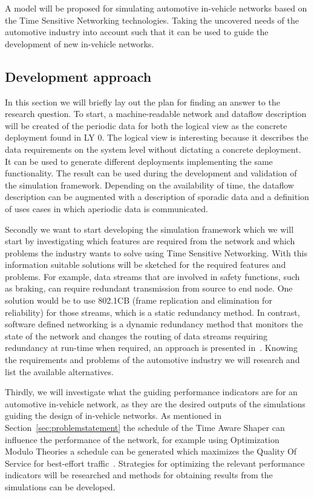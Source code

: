 A model will be proposed for simulating automotive in-vehicle networks based on the Time Sensitive Networking technologies. Taking the uncovered needs of the automotive industry into account such that it can be used to guide the development of new in-vehicle networks.

\subsection{Development approach}
\label{sec:researchdevelopment}
In this section we will briefly lay out the plan for finding an answer to the research question. To start, a machine-readable network and dataflow description will be created of the periodic data for both the logical view as the concrete deployment found in LY 0. The logical view is interesting because it describes the data requirements on the system level without dictating a concrete deployment. It can be used to generate different deployments implementing the same functionality. The result can be used during the development and validation of the simulation framework. Depending on the availability of time, the dataflow description can be augmented with a description of sporadic data and a definition of uses cases in which aperiodic data is communicated.

Secondly we want to start developing the simulation framework which we will start by investigating which features are required from the network and which problems the industry wants to solve using Time Sensitive Networking. With this information suitable solutions will be sketched for the required features and problems. For example, data streams that are involved in safety functions, such as braking, can require redundant transmission from source to end node. One solution would be to use 802.1CB (frame replication and elimination for reliability) for those streams, which is a static redundancy method. In contrast, software defined networking is a dynamic redundancy method that monitors the state of the network and changes the routing of data streams requiring redundancy at run-time when required, an approach is presented in~\cite{kong2021run}. Knowing the requirements and problems of the automotive industry we will research and list the available alternatives.

Thirdly, we will investigate what the guiding performance indicators are for an automotive in-vehicle network, as they are the desired outputs of the simulations guiding the design of in-vehicle networks. As mentioned in Section~\ref{sec:problemstatement} the schedule of the Time Aware Shaper can influence the performance of the network, for example using Optimization Modulo Theories a schedule can be generated which maximizes the Quality Of Service for best-effort traffic~\cite{houtan2021synthesising}. Strategies for optimizing the relevant performance indicators will be researched and methods for obtaining results from the simulations can be developed. 

